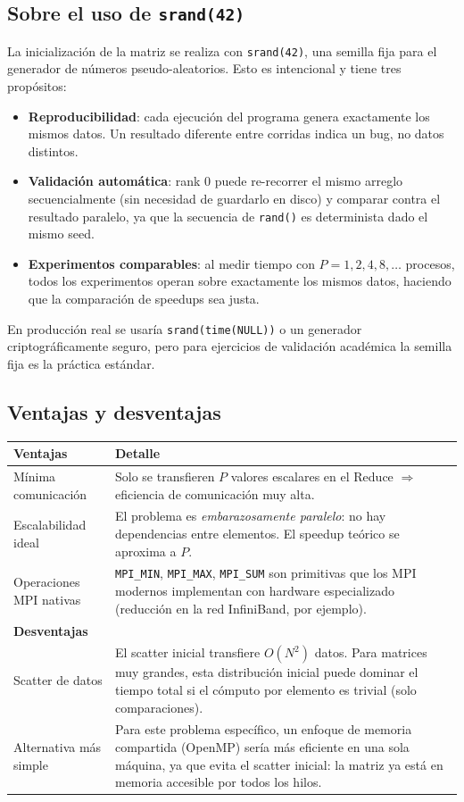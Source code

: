 \documentclass[12pt,a4paper]{article}
\begin{document}
\subsection{Sobre el uso de \texttt{srand(42)}}

La inicialización de la matriz se realiza con \texttt{srand(42)}, una semilla fija
para el generador de números pseudo-aleatorios. Esto es intencional y tiene tres
propósitos:

\begin{itemize}
  \item \textbf{Reproducibilidad}: cada ejecución del programa genera exactamente los
    mismos datos. Un resultado diferente entre corridas indica un bug, no datos distintos.
  \item \textbf{Validación automática}: rank 0 puede re-recorrer el mismo arreglo
    secuencialmente (sin necesidad de guardarlo en disco) y comparar contra el resultado
    paralelo, ya que la secuencia de \texttt{rand()} es determinista dado el mismo seed.
  \item \textbf{Experimentos comparables}: al medir tiempo con $P = 1, 2, 4, 8, \ldots$
    procesos, todos los experimentos operan sobre exactamente los mismos datos,
    haciendo que la comparación de speedups sea justa.
\end{itemize}

En producción real se usaría \texttt{srand(time(NULL))} o un generador
criptográficamente seguro, pero para ejercicios de validación académica la
semilla fija es la práctica estándar.

\subsection{Ventajas y desventajas}

\begin{longtable}{L{4cm} L{10cm}}
\toprule
\textbf{Ventajas} & \textbf{Detalle} \\
\midrule
\endhead
Mínima comunicación & Solo se transfieren $P$ valores escalares en el Reduce
  $\Rightarrow$ eficiencia de comunicación muy alta. \\[4pt]
Escalabilidad ideal & El problema es \textit{embarazosamente paralelo}: no hay
  dependencias entre elementos. El speedup teórico se aproxima a $P$. \\[4pt]
Operaciones MPI nativas & \texttt{MPI\_MIN}, \texttt{MPI\_MAX}, \texttt{MPI\_SUM}
  son primitivas que los MPI modernos implementan con hardware especializado
  (reducción en la red InfiniBand, por ejemplo). \\
\midrule
\textbf{Desventajas} & \\
\midrule
Scatter de datos & El scatter inicial transfiere $O(N^2)$ datos. Para matrices muy
  grandes, esta distribución inicial puede dominar el tiempo total si el cómputo
  por elemento es trivial (solo comparaciones). \\[4pt]
Alternativa más simple & Para este problema específico, un enfoque de memoria
  compartida (OpenMP) sería más eficiente en una sola máquina, ya que evita el
  scatter inicial: la matriz ya está en memoria accesible por todos los hilos. \\
\bottomrule
\end{longtable}
\end{document}
